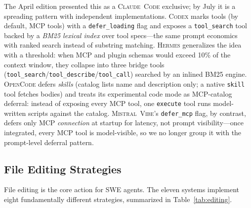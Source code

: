\documentclass[11pt,a4paper]{article}
\newcommand{\clcode}{\textsc{Claude~Code}\xspace}
\newcommand{\cdx}{\textsc{Codex}\xspace}
\newcommand{\vibe}{\textsc{Mistral~Vibe}\xspace}
\newcommand{\hrm}{\textsc{Hermes}\xspace}
\newcommand{\ocd}{\textsc{OpenCode}\xspace}
\begin{document}
The April edition presented this as a \clcode{} exclusive; by July it is a spreading pattern with independent implementations.
\cdx{} marks tools (by default, MCP tools) with a \texttt{defer\_loading} flag and exposes a \texttt{tool\_search} tool backed by a \emph{BM25 lexical index} over tool specs---the same prompt economics with ranked search instead of substring matching.
\hrm{} generalizes the idea with a threshold: when MCP and plugin schemas would exceed 10\% of the context window, they collapse into three bridge tools (\texttt{tool\_search}/\texttt{tool\_describe}/\texttt{tool\_call}) searched by an inlined BM25 engine.
\ocd{} defers \emph{skills} (catalog lists name and description only; a native \texttt{skill} tool fetches bodies) and treats its experimental code mode as MCP-catalog deferral: instead of exposing every MCP tool, one \texttt{execute} tool runs model-written scripts against the catalog.
\vibe{}'s \texttt{defer\_mcp} flag, by contrast, defers only MCP \emph{connection} at startup for latency, not prompt visibility---once integrated, every MCP tool is model-visible, so we no longer group it with the prompt-level deferral pattern.

\subsection{File Editing Strategies}
\label{sec:editing}

File editing is the core action for SWE agents.
The eleven systems implement eight fundamentally different strategies, summarized in Table~\ref{tab:editing}.
\end{document}
